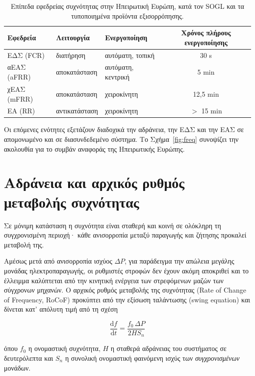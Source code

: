 \begin{table}[!htbp]
\centering
\begin{tabular}{lllc}
\hline
Εφεδρεία & Λειτουργία & Ενεργοποίηση & Χρόνος πλήρους ενεργοποίησης \\
\hline
ΕΔΣ (FCR)   & διατήρηση      & αυτόματη, τοπική   & 30 s \\
αΕΑΣ (aFRR) & αποκατάσταση   & αυτόματη, κεντρική & 5 min \\
χΕΑΣ (mFRR) & αποκατάσταση   & χειροκίνητη        & 12,5 min \\
ΕΑ (RR)     & αντικατάσταση  & χειροκίνητη        & $>$ 15 min \\
\hline
\end{tabular}
\caption{Επίπεδα εφεδρείας συχνότητας στην Ηπειρωτική Ευρώπη, κατά τον SOGL και τα
τυποποιημένα προϊόντα εξισορρόπησης.}
\label{tab:reserves}
\end{table}

Οι επόμενες ενότητες εξετάζουν διαδοχικά την αδράνεια, την ΕΔΣ και την ΕΑΣ σε απομονωμένο
και σε διασυνδεδεμένο σύστημα. Το Σχήμα~\ref{fig:freq} συνοψίζει την ακολουθία για το συμβάν
αναφοράς της Ηπειρωτικής Ευρώπης.

\section{Αδράνεια και αρχικός ρυθμός μεταβολής συχνότητας}
\label{sec:inertia}

Σε μόνιμη κατάσταση η συχνότητα είναι σταθερή και κοινή σε ολόκληρη τη συγχρονισμένη
περιοχή· κάθε ανισορροπία μεταξύ παραγωγής και ζήτησης προκαλεί μεταβολή της.

Αμέσως μετά από ανισορροπία ισχύος $\Delta P$, για παράδειγμα την απώλεια μεγάλης μονάδας
ηλεκτροπαραγωγής, οι ρυθμιστές στροφών δεν έχουν ακόμη αποκριθεί και το έλλειμμα καλύπτεται
από την κινητική ενέργεια των στρεφόμενων μαζών των σύγχρονων μηχανών. Ο αρχικός ρυθμός
μεταβολής της συχνότητας (Rate of Change of Frequency, RoCoF) προκύπτει από την εξίσωση
ταλάντωσης (swing equation) και δίνεται κατ' απόλυτη τιμή από τη σχέση

\begin{equation}
\frac{\mathrm{d}f}{\mathrm{d}t} = \frac{f_0 \, \Delta P}{2 H S_n}
\label{eq:rocof}
\end{equation}

όπου $f_0$ η ονομαστική συχνότητα, $H$ η σταθερά αδράνειας του συστήματος σε δευτερόλεπτα
και $S_n$ η συνολική ονομαστική φαινόμενη ισχύς των \emph{συγχρονισμένων} μονάδων.

